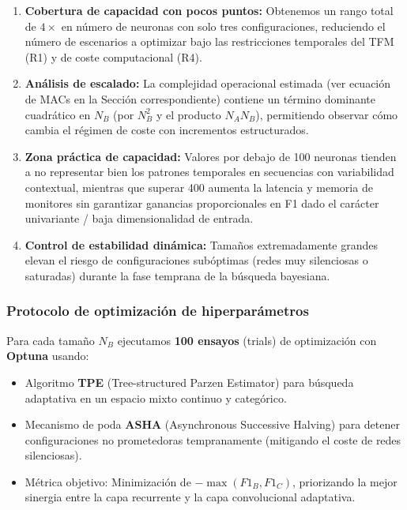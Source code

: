 \begin{enumerate}
    \item \textbf{Cobertura de capacidad con pocos puntos:} Obtenemos un rango total de $4\times$ en número de neuronas con solo tres configuraciones, reduciendo el número de escenarios a optimizar bajo las restricciones temporales del TFM (R1) y de coste computacional (R4).
    \item \textbf{Análisis de escalado:} La complejidad operacional estimada (ver ecuación de MACs en la Sección correspondiente) contiene un término dominante cuadrático en $N_B$ (por $N_B^2$ y el producto $N_A N_B$), permitiendo observar cómo cambia el régimen de coste con incrementos estructurados.
    \item \textbf{Zona práctica de capacidad:} Valores por debajo de 100 neuronas tienden a no representar bien los patrones temporales en secuencias con variabilidad contextual, mientras que superar 400 aumenta la latencia y memoria de monitores sin garantizar ganancias proporcionales en F1 dado el carácter univariante / baja dimensionalidad de entrada.
    \item \textbf{Control de estabilidad dinámica:} Tamaños extremadamente grandes elevan el riesgo de configuraciones subóptimas (redes muy silenciosas o saturadas) durante la fase temprana de la búsqueda bayesiana.
\end{enumerate}

\subsubsection{Protocolo de optimización de hiperparámetros}
Para cada tamaño $N_B$ ejecutamos \textbf{100 ensayos} (trials) de optimización con \textbf{Optuna} usando:
\begin{itemize}
    \item Algoritmo \textbf{TPE} (Tree-structured Parzen Estimator) para búsqueda adaptativa en un espacio mixto continuo y categórico.
    \item Mecanismo de poda \textbf{ASHA} (Asynchronous Successive Halving) para detener configuraciones no prometedoras tempranamente (mitigando el coste de redes silenciosas).
    \item Métrica objetivo: Minimización de $-\max(F1_B, F1_C)$, priorizando la mejor sinergia entre la capa recurrente y la capa convolucional adaptativa.
\end{itemize}


